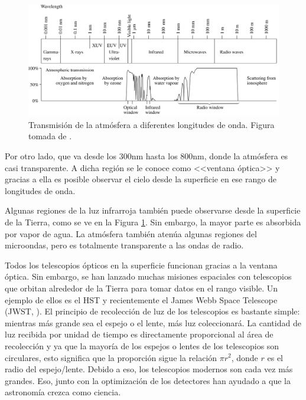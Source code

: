 \begin{figure}
  \centering
	\includegraphics[width=\textwidth]{figures/atmosphere.png}
	\caption{Transmisión de la atmósfera a diferentes longitudes de onda. Figura tomada de \citet{karttunen2007fundamental}.}
	\label{fig:atmosphere-atenuation} 
\end{figure}

Por otro lado, que va desde los $ 300 \mathrm{nm} $ hasta los $ 800 \mathrm{nm} $, donde la atmósfera es casi transparente. A dicha región se le conoce como <<ventana óptica>> y gracias a ella es posible observar el cielo desde la superficie en ese rango de longitudes de onda. 

Algunas regiones de la luz infrarroja también puede observarse desde la superficie de la Tierra, como se ve en la Figura \ref{fig:atmosphere-atenuation}. Sin embargo, la mayor parte es absorbida por vapor de agua. La atmósfera también atenúa algunas regiones del microondas, pero es totalmente transparente a las ondas de radio. 

Todos los telescopios ópticos en la superficie funcionan gracias a la ventana óptica. Sin embargo, se han lanzado muchas misiones espaciales con telescopios que orbitan alrededor de la Tierra para tomar datos en el rango visible. Un ejemplo de ellos es el HST y recientemente el James Webb Space Telescope (JWST, \cite{gardner2023james}). El principio de recolección de luz de los telescopios es bastante simple: mientras más grande sea el espejo o el lente, más luz coleccionará. La cantidad de luz recibida por unidad de tiempo es directamente proporcional al área de recolección y ya que la mayoría de los espejos o lentes de los telescopios son circulares, esto significa que la proporción sigue la relación $ \pi r^2 $, donde $ r $ es el radio del espejo/lente. Debido a eso, los telescopios modernos son cada vez más grandes. Eso, junto con la optimización de los detectores han ayudado a que la astronomía crezca como ciencia. 



